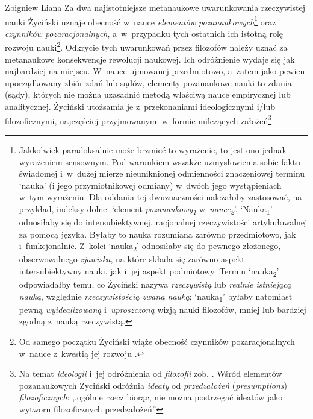 \begin{artplenv}{Zbigniew Liana}
Za dwa najistotniejsze metanaukowe uwarunkowania rzeczywistej nauki Życiński uznaje obecność w~nauce \textit{elementów
pozanaukowych}\footnote{Jakkolwiek paradoksalnie może brzmieć to wyrażenie, to jest ono jednak wyrażeniem sensownym.
Pod warunkiem wszakże uzmysłowienia sobie faktu świadomej i~w~dużej mierze nieuniknionej odmienności znaczeniowej
terminu `nauka' (i jego przymiotnikowej odmiany) w~dwóch jego wystąpieniach w~tym wyrażeniu. Dla oddania tej
dwuznaczności należałoby zastosować, na przykład, indeksy dolne: `element
\textit{pozanaukowy\textsubscript{1}} w~\textit{nauce\textsubscript{2}}'.
`Nauka\textsubscript{1}' odnosiłaby się do intersubiektywnej,
racjonalnej rzeczywistości artykułowalnej za pomocą języka. Byłaby to
nauka rozumiana zarówno przedmiotowo, jak i~funkcjonalnie. Z~kolei
`nauka\textsubscript{2}' odnosiłaby się do pewnego złożonego,
obserwowalnego \textit{zjawiska}, na które składa się zarówno aspekt intersubiektywny nauki, jak i~jej aspekt podmiotowy.
Termin `nauka\textsubscript{2}' odpowiadałby temu, co Życiński
nazywa \textit{rzeczywistą} lub \textit{realnie istniejącą nauką}, względnie
\textit{rzeczywistością zwaną nauką};
`nauka\textsubscript{1}' byłaby natomiast pewną \textit{wyidealizowaną} i~\textit{uproszczoną} wizją
nauki filozofów, mniej lub bardziej zgodną z~nauką rzeczywistą.} oraz
\textit{czynników pozaracjonalnych}, a~w~przypadku
tych ostatnich ich istotną rolę rozwoju nauki\footnote{Od samego początku Życiński wiąże obecność czynników
pozaracjonalnych w~nauce z~kwestią jej rozwoju
\parencite[zob.][s.~143]{zycinski_jezyk_1983}.
}. Odkrycie
tych uwarunkowań przez filozofów należy uznać za metanaukowe konsekwencje rewolucji naukowej. Ich odróżnienie wydaje się
jak najbardziej na miejscu. W~nauce ujmowanej przedmiotowo, a~zatem jako pewien uporządkowany zbiór zdań lub sądów,
elementy pozanaukowe nauki to zdania (sądy), których nie można uzasadnić metodą właściwą nauce empirycznej lub
analitycznej. Życiński utożsamia je z~przekonaniami ideologicznymi i/lub filozoficznymi, najczęściej przyjmowanymi w~formie
milczących założeń\footnote{Na temat \textit{ideologii} i~jej odróżnienia od \textit{filozofii}
zob. \parencites[s.~18]{zycinski_structure_1988}[s.~33]{zycinski_struktura_2013}.
Wśród elementów pozanaukowych
Życiński odróżnia \textit{ideaty} od \textit{przedzałożeń} (\textit{presumptions}) \textit{filozoficznych}: ,,ogólnie rzecz
biorąc, nie można postrzegać ideatów jako wytworu filozoficznych przedzałożeń''
}
\end{artplenv}
